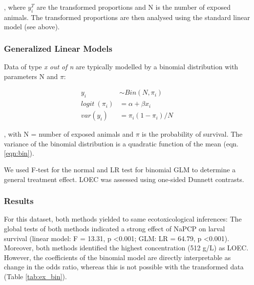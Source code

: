\documentclass{scrartcl}
\begin{document}
, where $y_i^T$ are the transformed proportions and N is the number of exposed animals.
The transformed proportions are then analysed using the standard linear model (see above).

\subsubsection{Generalized Linear Models}

Data of type \emph{x out of n} are typically modelled by a binomial distribution with parameters N and $\pi$:

\begin{align}
  y_i &\sim Bin(N, \pi_i) \nonumber \\
  logit~(\pi_i) &= \alpha + \beta x_i \label{eqn:bin} \\
  var(y_i) &=  \pi_i (1 - \pi_i) / N \nonumber
\end{align}

, with N = number of exposed animals and $\pi$ is the probability of survival.
The variance of the binomial distribution is a quadratic function of the mean (eqn. \ref{eqn:bin}).

We used F-test for the normal and LR test for binomial GLM to determine a general treatment effect.
LOEC was assessed using one-sided Dunnett contrasts.


\subsubsection{Results}
For this dataset, both methods yielded to same ecotoxicological inferences:
The global tests of both methods indicated a strong effect of NaPCP on larval survival (linear model: F = 13.31, p \textless 0.001; GLM: LR = 64.79, p \textless 0.001).
Moreover, both methods identified the highest concentration (512 \textmu g/L) as LOEC. 
However, the coefficients of the binomial model are directly interpretable as change in the odds ratio, whereas this is not possible with the transformed data (Table \ref{tab:ex_bin}).
\end{document}
